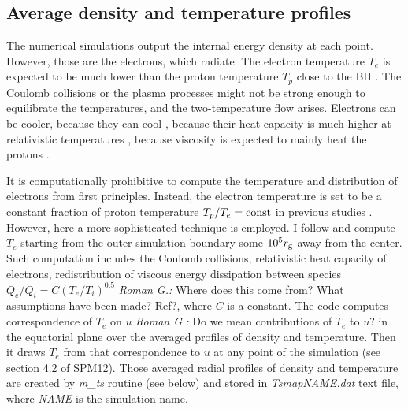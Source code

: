 \documentclass{emulateapj}
\newcommand{\rg}[1]{\color{blue}\textit{Roman G.:} #1\color{black}}
\begin{document}
\subsection{Average density and temperature profiles}
The numerical simulations output the internal energy density at each
point. However, those are the electrons, which radiate.  The electron
temperature $T_e$ is expected to be much lower than the proton
temperature $T_p$ close to the BH \citep{Narayan:1995kj}.  The Coulomb
collisions or the plasma processes might not be strong enough to
equilibrate the temperatures, and the two-temperature flow arises.
Electrons can be cooler, because they can cool
\citep{Drappeau:2012dq}, because their heat capacity is much higher at
relativistic temperatures \citep{Shcherbakov:2010cond}, because
viscosity is expected to mainly heat the protons
\citep{Narayan:1995kj,Sharma_heating:2007}.

It is computationally prohibitive to compute the temperature and
distribution of electrons from first principles. Instead, the electron
temperature is set to be a constant fraction of proton temperature
$T_p/T_e=\rm const$ in previous studies
\citep{Moscibrodzka:2009,Dexter:2010lk}.  However, here a more
sophisticated technique is employed. I follow
\citet{Sharma_heating:2007} and compute $T_e$ starting from the outer
simulation boundary some $10^5r_{\rm g}$ away from the center. Such
computation includes the Coulomb collisions, relativistic heat
capacity of electrons, redistribution of viscous energy dissipation
between species $Q_e/Q_i=C(T_e/T_i)^{0.5}$ \rg{Where does this come
  from? What assumptions have been made? Ref?}, where $C$ is a
constant.  The code computes correspondence of $T_e$ on $u$ \rg{Do we
  mean contributions of $T_e$ to $u$?} in the equatorial plane over
the averaged profiles of density and temperature.  Then it draws $T_e$
from that correspondence to $u$ at any point of the simulation (see
section 4.2 of SPM12).  Those averaged radial profiles of density and
temperature are created by \textit{m\_ts} routine (see below) and
stored in \textit{TsmapNAME.dat} text file, where \textit{NAME} is the
simulation name.
\end{document}
